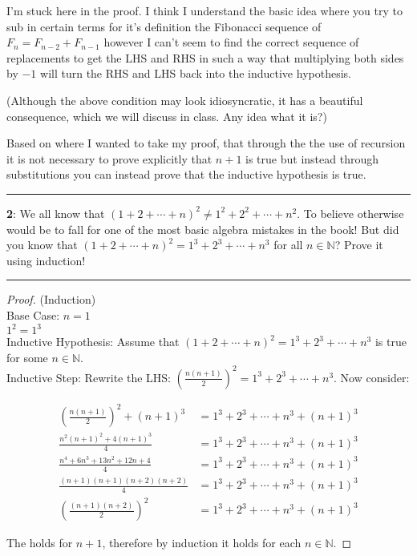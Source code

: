 \documentclass[11pt]{article}
\newcommand\question[2]{\vspace{.25in}\hrule\textbf{#1}: #2\vspace{.5em}\hrule\vspace{.10in}}
\renewcommand\part[1]{\vspace{.10in}(#1)\par}
\newcommand{\N}{\mathbb{N}}
\begin{document}
	I'm stuck here in the proof. I think I understand the basic idea where you try to sub in certain terms for it's definition the Fibonacci sequence of $F_n = F_{n-2} + F_{n-1}$ however I can't seem to find the correct sequence of replacements to get the LHS and RHS in such a way that multiplying both sides by $-1$ will turn the RHS and LHS back into the inductive hypothesis.

\part{Although the above condition may look idiosyncratic, it has a beautiful consequence, which we will discuss in class. Any idea what it is?}
	Based on where I wanted to take my proof, that through the the use of recursion it is not necessary to prove explicitly that $n+1$ is true but instead through substitutions you can instead prove that the inductive hypothesis is true.


\question{2}{We all know that $(1+2+ \cdots + n)^2 \ne 1^2 + 2^2 + \cdots + n^2$. To believe otherwise would be to fall for one of the most basic algebra mistakes in the book! But did you know that $(1+2+\cdots+n)^2 = 1^3 + 2^3 + \cdots + n^3$ for all $n \in \N$? Prove it using induction!}

\begin{proof}
	(Induction)\\
	Base Case: $n=1$\\
	$1^2 = 1^3$\\
	Inductive Hypothesis: Assume that $(1+2+\cdots+n)^2 = 1^3 + 2^3 + \cdots + n^3$ is true for some $n \in \N$.\\
	Inductive Step: Rewrite the LHS: $\left(\frac{n(n+1)}{2} \right)^2 = 1^3 + 2^3 + \cdots + n^3$. Now consider: 

	\begin{align*}
		\left(\frac{n(n+1)}{2} \right)^2 + (n+1)^3 &= 1^3 + 2^3 + \cdots + n^3 + (n+1)^3\\
		\frac{n^2(n+1)^2 + 4(n+1)^3}{4} &= 1^3 + 2^3 + \cdots + n^3 + (n+1)^3\\
		\frac{n^4 + 6n^3 + 13n^2 + 12n + 4}{4} &= 1^3 + 2^3 + \cdots + n^3 + (n+1)^3\\
		\frac{(n+1)(n+1)(n+2)(n+2)}{4} &= 1^3 + 2^3 + \cdots + n^3 + (n+1)^3\\
		\left(\frac{(n+1)(n+2)}{2}\right)^2 &= 1^3 + 2^3 + \cdots + n^3 + (n+1)^3
	\end{align*}

	The holds for $n+1$, therefore by induction it holds for each $n \in \N$.
\end{proof}
\end{document}
